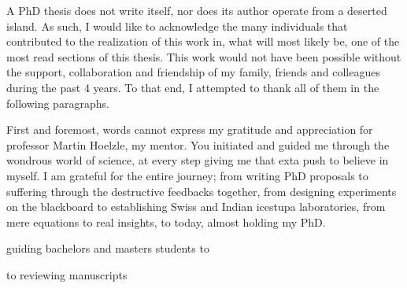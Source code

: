 %
\label{sec:acknowledgement}

A PhD thesis does not write itself, nor does its author operate from a deserted island. As such, I would like to
acknowledge the many individuals that contributed to the realization of this work in, what will most likely be,
one of the most read sections of this thesis. This work would not have been possible without the support,
collaboration and friendship of my family, friends and colleagues during the past 4 years. To that end, I
attempted to thank all of them in the following paragraphs.

First and foremost, words cannot express my gratitude and appreciation for professor Martin Hoelzle, my mentor.
You initiated and guided me through the wondrous world of science, at every step giving me that exta push to
believe in myself. I am grateful for the entire journey; from writing PhD proposals to suffering through the
destructive feedbacks together, from designing experiments on the blackboard to establishing Swiss and Indian
icestupa laboratories, from mere equations to real insights, to today, almost holding my PhD. 

guiding bachelors and masters students to 

to reviewing manuscripts 
